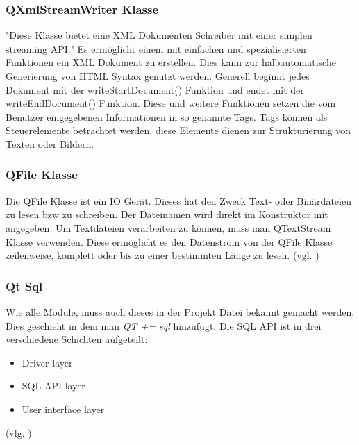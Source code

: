\subsubsection{QXmlStreamWriter Klasse}

"Diese Klasse bietet eine XML Dokumenten Schreiber mit einer simplen streaming \ac{API}." 
\cite{QtXSW}
Es ermöglicht einem mit einfachen und spezialisierten Funktionen ein XML Dokument zu erstellen. Dies kann zur halbautomatische Generierung von HTML Syntax genutzt werden. Generell beginnt jedes Dokument mit der writeStartDocument() Funktion und endet mit der writeEndDocument() Funktion. Diese und weitere Funktionen setzen die vom Benutzer eingegebenen Informationen in so genannte Tags. Tags können als Steuerelemente betrachtet werden, diese Elemente dienen zur Strukturierung von Texten oder Bildern.
	
\subsubsection{QFile Klasse}
Die QFile Klasse ist ein \ac{IO} Gerät. Dieses hat den Zweck Text- oder Binärdateien zu lesen bzw zu schreiben. Der Dateinamen wird direkt im Konstruktor mit angegeben. Um Textdateien verarbeiten zu können, muss man QTextStream Klasse verwenden. Diese ermöglicht es den Datenstrom von der QFile Klasse zeilenweise, komplett oder bis zu einer bestimmten Länge zu lesen. (vgl. \cite{QtFL})
	
\subsubsection{Qt Sql}
Wie alle Module, muss auch dieses in der Projekt Datei bekannt gemacht werden. Dies geschieht in dem man \textit{QT += sql} hinzufügt. Die \ac{SQL} \ac{API} ist in drei verschiedene Schichten aufgeteilt:
\begin{itemize}
\item Driver layer
\item SQL API layer
\item User interface layer
\end{itemize}
(vlg. \cite{QtSQL})
	
